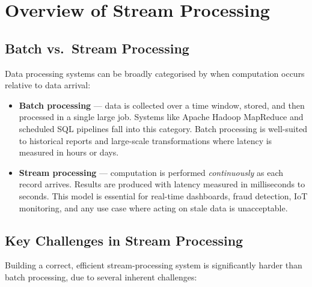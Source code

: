 \section{Overview of Stream Processing}

\subsection{Batch vs.\ Stream Processing}

Data processing systems can be broadly categorised by when computation occurs
relative to data arrival:

\begin{itemize}
  \item \textbf{Batch processing} — data is collected over a time window, stored, and then
        processed in a single large job. Systems like Apache Hadoop MapReduce and scheduled
        SQL pipelines fall into this category. Batch processing is well-suited to historical
        reports and large-scale transformations where latency is measured in hours or days.
  \item \textbf{Stream processing} — computation is performed \emph{continuously} as each record
        arrives. Results are produced with latency measured in milliseconds to seconds.
        This model is essential for real-time dashboards, fraud detection, IoT monitoring,
        and any use case where acting on stale data is unacceptable.
\end{itemize}

\subsection{Key Challenges in Stream Processing}

Building a correct, efficient stream-processing system is significantly harder than
batch processing, due to several inherent challenges:

